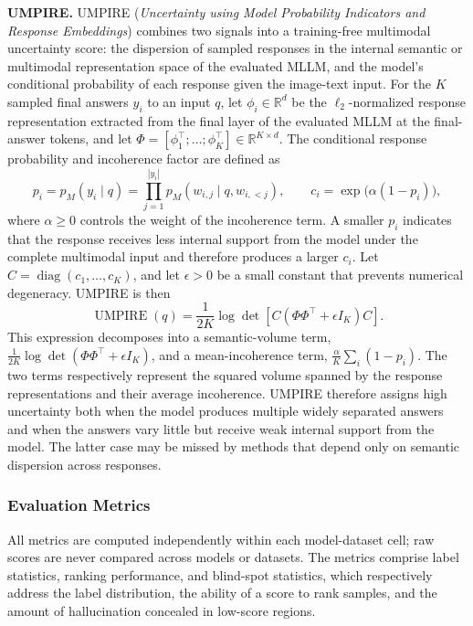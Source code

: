 \textbf{UMPIRE.} UMPIRE (\textit{Uncertainty using Model Probability Indicators and Response Embeddings}) combines two signals into a training-free multimodal uncertainty score: the dispersion of sampled responses in the internal semantic or multimodal representation space of the evaluated MLLM, and the model's conditional probability of each response given the image-text input. For the $K$ sampled final answers $y_i$ to an input $q$, let $\phi_i\in\mathbb{R}^d$ be the $\ell_2$-normalized response representation extracted from the final layer of the evaluated MLLM at the final-answer tokens, and let $\Phi=[\phi_1^\top;\ldots;\phi_K^\top]\in\mathbb{R}^{K\times d}$. The conditional response probability and incoherence factor are defined as
\[
p_i=p_M(y_i\mid q)=\prod_{j=1}^{|y_i|}p_M(w_{i,j}\mid q,w_{i,<j}),
\qquad
c_i=\exp\!\bigl(\alpha(1-p_i)\bigr),
\]
where $\alpha\geq0$ controls the weight of the incoherence term. A smaller $p_i$ indicates that the response receives less internal support from the model under the complete multimodal input and therefore produces a larger $c_i$. Let $C=\operatorname{diag}(c_1,\ldots,c_K)$, and let $\epsilon>0$ be a small constant that prevents numerical degeneracy. UMPIRE is then
\[
\operatorname{UMPIRE}(q)=\frac{1}{2K}\log\det\!\left[C\left(\Phi\Phi^\top+\epsilon I_K\right)C\right].
\]
This expression decomposes into a semantic-volume term, $\frac{1}{2K}\log\det(\Phi\Phi^\top+\epsilon I_K)$, and a mean-incoherence term, $\frac{\alpha}{K}\sum_i(1-p_i)$. The two terms respectively represent the squared volume spanned by the response representations and their average incoherence. UMPIRE therefore assigns high uncertainty both when the model produces multiple widely separated answers and when the answers vary little but receive weak internal support from the model. The latter case may be missed by methods that depend only on semantic dispersion across responses.

\subsubsection{Evaluation Metrics}
\label{subsubsec:evaluation_metrics}

All metrics are computed independently within each model-dataset cell; raw scores are never compared across models or datasets. The metrics comprise label statistics, ranking performance, and blind-spot statistics, which respectively address the label distribution, the ability of a score to rank samples, and the amount of hallucination concealed in low-score regions.

